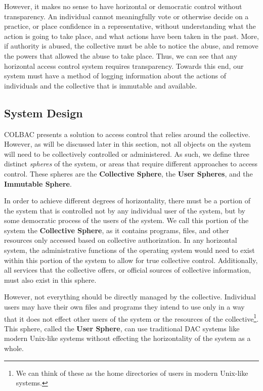 However, it makes no sense to have horizontal or democratic control without
transparency. An individual cannot meaningfully vote or otherwise decide on a
practice, or place confidence in a representative, without understanding what
the action is going to take place, and what actions have been taken in the past.
More, if authority is abused, the collective must be able to notice the abuse,
and remove the powers that allowed the abuse to take place. Thus, we can see
that any horizontal access control system requires transparency. Towards this
end, our system must have a method of logging information about the actions of
individuals and the collective that is immutable and available.

\subsection{System Design}
\label{sec:colbacdesign}
COLBAC presents a solution to access control that relies around the collective.
However, as will be discussed later in this section, not all objects on the
system will need to be collectively controlled or administered. As such, we
define three distinct \textit{spheres} of the system, or areas that require
different approaches to access control. These spheres are the \textbf{Collective
Sphere}, the \textbf{User Spheres}, and the \textbf{Immutable Sphere}.

In order to achieve different degrees of horizontality, there must be a portion
of the system that is controlled not by any individual user of the system, but
by some democratic process of the users of the system. We call this portion of
the system the \textbf{Collective Sphere}, as it contains programs, files, and
other resources only accessed based on collective authorization. In any
horizontal system, the administrative functions of the operating system would
need to exist within this portion of the system to allow for true collective
control. Additionally, all services that the collective offers, or official
sources of collective information, must also exist in this sphere.

However, not everything should be directly managed by the collective. Individual
users may have their own files and programs they intend to use only in a way
that it does not effect other users of the system or the resources of the
collective\footnote{We can think of these as the home directories of users in
modern Unix-like systems.}. This sphere, called the \textbf{User Sphere},
can use traditional DAC systems like modern Unix-like systems without effecting
the horizontality of the system as a whole.

